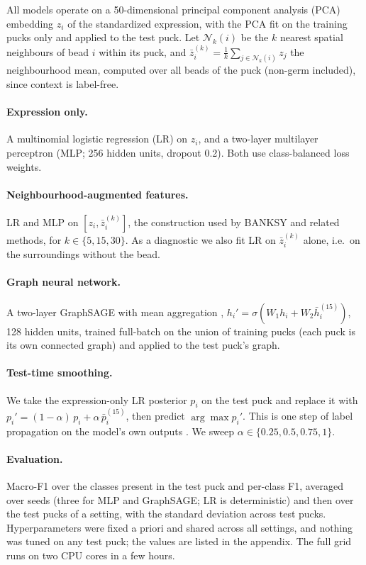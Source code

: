 All models operate on a 50-dimensional principal component analysis (PCA) embedding $z_i$ of the standardized expression, with the PCA fit on the training pucks only and applied to the test puck. Let $\mathcal{N}_k(i)$ be the $k$ nearest spatial neighbours of bead $i$ within its puck, and $\bar z_i^{(k)} = \frac{1}{k}\sum_{j\in\mathcal{N}_k(i)} z_j$ the neighbourhood mean, computed over all beads of the puck (non-germ included), since context is label-free.

\paragraph{Expression only.} A multinomial logistic regression (LR) on $z_i$, and a two-layer multilayer perceptron (MLP; 256 hidden units, dropout 0.2). Both use class-balanced loss weights.

\paragraph{Neighbourhood-augmented features.} LR and MLP on $[z_i, \bar z_i^{(k)}]$, the construction used by BANKSY \citep{singhal2024banksy} and related methods, for $k\in\{5,15,30\}$. As a diagnostic we also fit LR on $\bar z_i^{(k)}$ alone, i.e.\ on the surroundings without the bead.

\paragraph{Graph neural network.} A two-layer GraphSAGE with mean aggregation \citep{hamilton2017inductive}, $h_i' = \sigma(W_1 h_i + W_2 \bar h_i^{(15)})$, 128 hidden units, trained full-batch on the union of training pucks (each puck is its own connected graph) and applied to the test puck's graph.

\paragraph{Test-time smoothing.} We take the expression-only LR posterior $p_i$ on the test puck and replace it with $p_i' = (1-\alpha)\,p_i + \alpha\,\bar p_i^{(15)}$, then predict $\arg\max p_i'$. This is one step of label propagation on the model's own outputs \citep{huang2021combining}. We sweep $\alpha\in\{0.25,0.5,0.75,1\}$.

\paragraph{Evaluation.} Macro-F1 over the classes present in the test puck and per-class F1, averaged over seeds (three for MLP and GraphSAGE; LR is deterministic) and then over the test pucks of a setting, with the standard deviation across test pucks. Hyperparameters were fixed a priori and shared across all settings, and nothing was tuned on any test puck; the values are listed in the appendix. The full grid runs on two CPU cores in a few hours.
